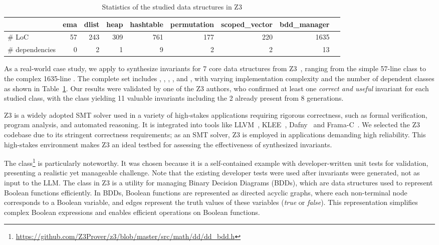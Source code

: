 \begin{table}[!htp]\centering
\caption{Statistics of the studied data structures in Z3}\label{tab:z3-data}
\small
\begin{tabular}{l|rrrrrrrr}\toprule
&ema &dlist &heap &hashtable &permutation &scoped\_vector &bdd\_manager \\\midrule
\# LoC &57 &243 &309 &761 &177 &220 &1635 \\
\# dependencies &0 &2 &1 &9 &2 &2 &13 \\
\bottomrule
\end{tabular}
\end{table}

As a real-world case study, we apply \tech to synthesize invariants for 7 core data structures from Z3~\cite{z3}, ranging from the simple 57-line  class to the complex 1635-line . The complete set includes , , , , and , with varying implementation complexity and the number of dependent classes as shown in Table~\ref{tab:z3-data}. 
Our results were validated by one of the Z3 authors, who confirmed at least one \emph{correct and useful} invariant for each studied class, with the  class yielding 11 valuable invariants including the 2 already present from 8 generations.

Z3 is a widely adopted SMT solver used in a variety of high-stakes applications requiring rigorous correctness, such as formal verification, program analysis, and automated reasoning. It is integrated into tools like LLVM~\cite{llvm}, KLEE~\cite{klee}, Dafny~\cite{leino2010dafny} and Frama-C~\cite{kirchner2015frama}.
We selected the Z3 codebase due to its stringent correctness requirements; as an SMT solver, Z3 is employed in applications demanding high reliability. This high-stakes environment makes Z3 an ideal testbed for assessing the effectiveness of synthesized invariants.


The  class\footnote{\url{https://github.com/Z3Prover/z3/blob/master/src/math/dd/dd_bdd.h}} is particularly noteworthy. 
It was chosen because it is a self-contained example with developer-written unit tests for validation, presenting a realistic yet manageable challenge. 
Note that the existing developer tests were used after invariants were generated, not as input to the LLM. 
The  class in Z3 is a utility for managing Binary Decision Diagrams (BDDs), which are data structures used to represent Boolean functions efficiently. In BDDs, Boolean functions are represented as directed acyclic graphs, where each non-terminal node corresponds to a Boolean variable, and edges represent the truth values of these variables (\textit{true} or \textit{false}). This representation simplifies complex Boolean expressions and enables efficient operations on Boolean functions.


